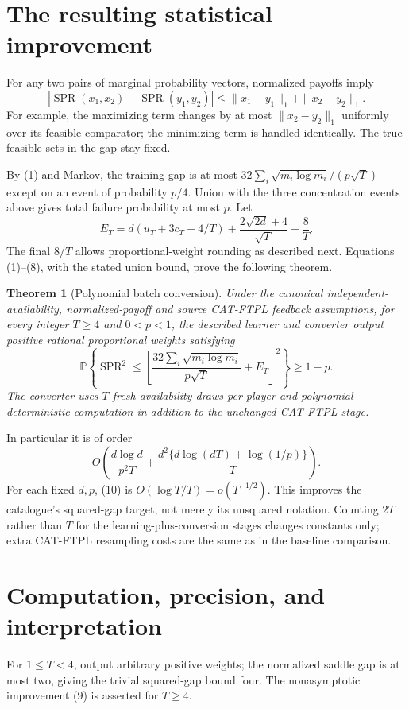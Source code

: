 \documentclass[11pt,a4paper]{article}
\newtheorem{theorem}{Theorem}[section]
\newcommand{\Prb}{\mathbb P}
\begin{document}
\section{The resulting statistical improvement}
For any two pairs of marginal probability vectors, normalized payoffs imply
\[
 |\operatorname{SPR}(x_1,x_2)-\operatorname{SPR}(y_1,y_2)|
 \le\|x_1-y_1\|_1+\|x_2-y_2\|_1. \tag{8}
\]
For example, the maximizing term changes by at most $\|x_2-y_2\|_1$ uniformly over its feasible comparator; the minimizing term is handled identically. The true feasible sets in the gap stay fixed.

By (1) and Markov, the training gap is at most $32\sum_i\sqrt{m_i\log m_i}/(p\sqrt T)$ except on an event of probability $p/4$. Union with the three concentration events above gives total failure probability at most $p$. Let
\[
 E_T=d(u_T+3c_T+4/T)+\frac{2\sqrt{2d}+4}{\sqrt T}+\frac8T.
\]
The final $8/T$ allows proportional-weight rounding as described next. Equations (1)--(8), with the stated union bound, prove the following theorem.
\begin{theorem}[Polynomial batch conversion]
Under the canonical independent-availability, normalized-payoff and source CAT-FTPL feedback assumptions, for every integer $T\ge4$ and $0<p<1$, the described learner and converter output positive rational proportional weights satisfying
\[
 \Prb\left\{\operatorname{SPR}^2\le
 \left[\frac{32\sum_i\sqrt{m_i\log m_i}}{p\sqrt T}+E_T\right]^2\right\}
 \ge1-p. \tag{9}
\]
The converter uses $T$ fresh availability draws per player and polynomial deterministic computation in addition to the unchanged CAT-FTPL stage.
\end{theorem}
In particular it is of order
\[
 O\left(\frac{d\log d}{p^2T}
       +\frac{d^2\{d\log(dT)+\log(1/p)\}}T\right). \tag{10}
\]
For each fixed $d,p$, (10) is $O(\log T/T)=o(T^{-1/2})$. This improves the catalogue's squared-gap target, not merely its unsquared notation. Counting $2T$ rather than $T$ for the learning-plus-conversion stages changes constants only; extra CAT-FTPL resampling costs are the same as in the baseline comparison.

\section{Computation, precision, and interpretation}
For $1\le T<4$, output arbitrary positive weights; the normalized saddle gap is at most two, giving the trivial squared-gap bound four. The nonasymptotic improvement (9) is asserted for $T\ge4$.
\end{document}
